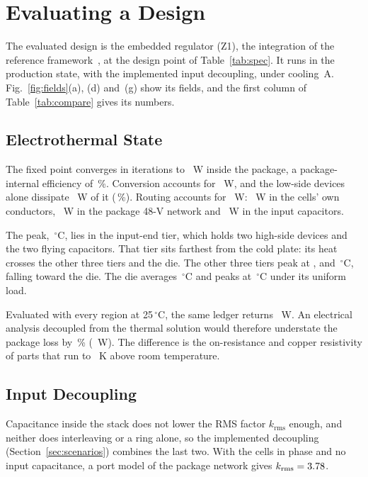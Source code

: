 \section{Evaluating a Design}\label{sec:evaluate}

The evaluated design is the embedded regulator (Z1), the integration of the reference
framework~\cite{Krishnakumar2026DVPD}, at the design point of Table~\ref{tab:spec}. It runs in the
production state, with the implemented input decoupling, under cooling~A.
Fig.~\ref{fig:fields}(a), (d) and~(g) show its fields, and the first column of
Table~\ref{tab:compare} gives its numbers.

\subsection{Electrothermal State}\label{sec:evaluate-et}
The fixed point converges in \WrEtItersAZoneWord{} iterations to \PlossAZone~W inside the package, a
package-internal efficiency of \WrEffAZone\,\%. Conversion accounts for \PconvAZone~W, and the
low-side devices alone dissipate \WrPconvLsAZone~W of it (\WrLsShareAZone\,\%). Routing accounts for
\ProuteAZone~W: \WrPintraAZone~W in the cells' own conductors, \WrPhvAZone~W in the package 48-V
network and \WrPringAZone~W in the input capacitors.

The peak, \TmaxAZone\,$^\circ$C, lies in the input-end tier, which holds two high-side devices and
the two flying capacitors. That tier sits farthest from the cold plate: its heat crosses the other
three tiers and the die. The other three tiers peak at \WrTtierTwoAZone, \WrTtierThreeAZone{} and
\WrTtierFourAZone\,$^\circ$C, falling toward the die. The die averages \WrTdieMeanAZone\,$^\circ$C and
peaks at \TdiemaxAZone\,$^\circ$C under its uniform load.

Evaluated with every region at 25\,$^\circ$C, the same ledger returns \WrIsoLoZone~W. An electrical
analysis decoupled from the thermal solution would therefore understate the package loss by
\WrUnderAZone\,\% (\WrRiseAZone~W). The difference is the on-resistance and copper resistivity of
parts that run \WrTlsRiseAZone{} to \WrThsRiseAZone~K above room temperature.

\subsection{Input Decoupling}\label{sec:evaluate-decap}
Capacitance inside the stack does not lower the RMS factor $k_{\mathrm{rms}}$ enough, and neither
does interleaving or a ring alone, so the implemented decoupling (Section~\ref{sec:scenarios})
combines the last two. With the cells in phase and no input capacitance, a port model of the package network
gives $k_{\mathrm{rms}} = 3.78$.

